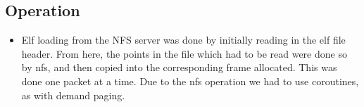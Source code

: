 \documentclass[12pt]{article}
\begin{document}
\subsection{Operation}
\begin{itemize}
\item Elf loading from the NFS server was done by initially reading in the elf file header. From here, the points in the file which had to be read were done so by nfs, and then copied into the corresponding frame allocated. This was done one packet at a time. Due to the nfs operation we had to use coroutines, as with demand paging.
\end{itemize}
\end{document}
